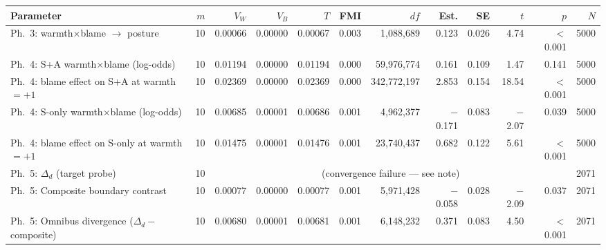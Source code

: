 \begin{tabular}{lrrrrrrrrrrr}
\toprule
Parameter & $m$ & $V_W$ & $V_B$ & $T$ & FMI & $df$ & Est. & SE & $t$ & $p$ & $N$ \\
\midrule
Ph.\ 3: warmth$\times$blame $\to$ posture & 10 & 0.00066 & 0.00000 & 0.00067 & 0.003 & 1{,}088{,}689 & 0.123 & 0.026 & 4.74 & $<$0.001 & 5000 \\
Ph.\ 4: S+A warmth$\times$blame (log-odds) & 10 & 0.01194 & 0.00000 & 0.01194 & 0.000 & 59{,}976{,}774 & 0.161 & 0.109 & 1.47 & 0.141 & 5000 \\
Ph.\ 4: blame effect on S+A at warmth$=+1$ & 10 & 0.02369 & 0.00000 & 0.02369 & 0.000 & 342{,}772{,}197 & 2.853 & 0.154 & 18.54 & $<$0.001 & 5000 \\
Ph.\ 4: S-only warmth$\times$blame (log-odds) & 10 & 0.00685 & 0.00001 & 0.00686 & 0.001 & 4{,}962{,}377 & $-$0.171 & 0.083 & $-$2.07 & 0.039 & 5000 \\
Ph.\ 4: blame effect on S-only at warmth$=+1$ & 10 & 0.01475 & 0.00001 & 0.01476 & 0.001 & 23{,}740{,}437 & 0.682 & 0.122 & 5.61 & $<$0.001 & 5000 \\
Ph.\ 5: $\Delta_d$ (target probe) & 10 & \multicolumn{9}{c}{(convergence failure — see note)} & 2071 \\
Ph.\ 5: Composite boundary contrast & 10 & 0.00077 & 0.00000 & 0.00077 & 0.001 & 5{,}971{,}428 & $-$0.058 & 0.028 & $-$2.09 & 0.037 & 2071 \\
Ph.\ 5: Omnibus divergence ($\Delta_d -$ composite) & 10 & 0.00680 & 0.00001 & 0.00681 & 0.001 & 6{,}148{,}232 & 0.371 & 0.083 & 4.50 & $<$0.001 & 2071 \\
\bottomrule
\end{tabular}
